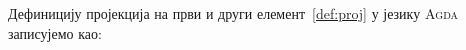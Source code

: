 Дефиницију пројекција на први и други елемент~\ref{def:proj} у језику \textsc{Agda} записујемо као:
\begin{code}%
\>[0]\AgdaSpace{}%
\AgdaSymbol{:}\AgdaSpace{}%
\AgdaSymbol{\{}\AgdaSpace{}%
\AgdaSymbol{:}\AgdaSpace{}%
\AgdaSpace{}%
\AgdaSpace{}%
\AgdaSymbol{\}}\AgdaSpace{}%
\AgdaSymbol{\{}\AgdaSpace{}%
\AgdaSymbol{:}\AgdaSpace{}%
\AgdaSpace{}%
\AgdaSpace{}%
\AgdaSpace{}%
\AgdaSpace{}%
\AgdaSymbol{\}}\AgdaSpace{}%
\AgdaSpace{}%
\AgdaSpace{}%
\AgdaSpace{}%
\AgdaSpace{}%
\<%
\\
\>[0]\AgdaSpace{}%
\AgdaSymbol{(}\AgdaSpace{}%
\AgdaOperator{\AgdaInductiveConstructor{,}}\AgdaSpace{}%
\AgdaSymbol{)}\AgdaSpace{}%
\AgdaSymbol{=}\AgdaSpace{}%
\<%
\\
%
\\[\AgdaEmptyExtraSkip]%
\>[0]\AgdaSpace{}%
\AgdaSymbol{:}\AgdaSpace{}%
\AgdaSymbol{\{}\AgdaSpace{}%
\AgdaSymbol{:}\AgdaSpace{}%
\AgdaSpace{}%
\AgdaSpace{}%
\AgdaSymbol{\}}\AgdaSpace{}%
\AgdaSymbol{\{}\AgdaSpace{}%
\AgdaSymbol{:}\AgdaSpace{}%
\AgdaSpace{}%
\AgdaSpace{}%
\AgdaSpace{}%
\AgdaSpace{}%
\AgdaSymbol{\}}\AgdaSpace{}%
\AgdaSpace{}%
\AgdaSymbol{(}\AgdaSpace{}%
\AgdaSymbol{:}\AgdaSpace{}%
\AgdaSpace{}%
\AgdaSymbol{)}\AgdaSpace{}%
\AgdaSpace{}%
\AgdaSpace{}%
\AgdaSymbol{(}\AgdaSpace{}%
\AgdaSymbol{)}\<%
\\
\>[0]\AgdaSpace{}%
\AgdaSymbol{(}\AgdaSpace{}%
\AgdaOperator{\AgdaInductiveConstructor{,}}\AgdaSpace{}%
\AgdaSymbol{)}\AgdaSpace{}%
\AgdaSymbol{=}\AgdaSpace{}%
\<%
\end{code}


